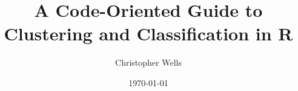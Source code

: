 \documentclass[a4paper,12pt]{book}
\begin{document}
\author{Christopher Wells}
\title{A Code-Oriented Guide to Clustering and Classification in R}
\date{\today}

\frontmatter
\maketitle
\tableofcontents

\mainmatter



\backmatter
\end{document}
